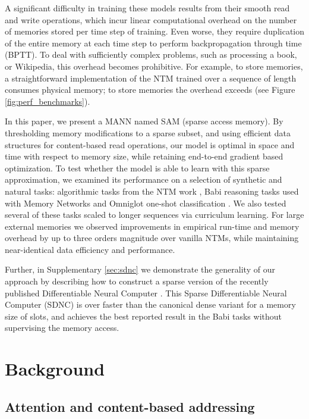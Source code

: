 \documentclass{article}
\begin{document}
A significant difficulty in training these models results from their smooth read and write operations, which incur linear computational overhead on the number of memories stored per time step of training. Even worse, they require duplication of the entire memory at each time step to perform backpropagation through time (BPTT). To deal with sufficiently complex problems, such as processing a book, or Wikipedia, this overhead becomes prohibitive. For example, to store  memories, a straightforward implementation of the NTM trained over a sequence of length  consumes  physical memory; to store  memories the overhead exceeds  (see Figure \ref{fig:perf_benchmarks}).

In this paper, we present a MANN named SAM (sparse access memory). By thresholding memory modifications to a sparse subset, and using efficient data structures for content-based read operations, our model is optimal in space and time with respect to memory size, while retaining end-to-end gradient based optimization. To test whether the model is able to learn with this sparse approximation, we examined its performance on a selection of synthetic and natural tasks: algorithmic tasks from the NTM work \cite{graves2014neural}, Babi reasoning tasks used with Memory Networks \cite{sukhbaatar2015end} and Omniglot one-shot classification \cite{santoro2016, lake2015human}. We also tested several of these tasks scaled to longer sequences via curriculum learning.  For large external memories we observed improvements in empirical run-time and memory overhead by up to three orders magnitude over vanilla NTMs, while maintaining near-identical data efficiency and performance.

Further, in Supplementary \ref{sec:sdnc} we demonstrate the generality of our approach by describing how to construct a sparse version of the recently published Differentiable Neural Computer   \cite{graves2016dnc}. This Sparse Differentiable Neural Computer (SDNC) is over  faster than the canonical dense variant for a memory size of  slots, and achieves the best reported result in the Babi tasks without supervising the memory access.

\section{Background}

\subsection{Attention and content-based addressing}
\end{document}

